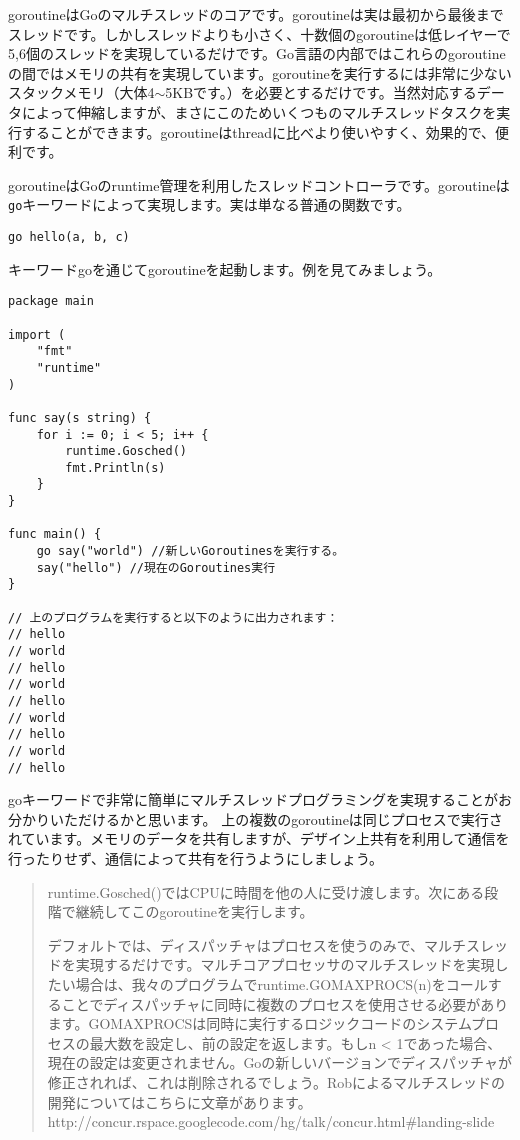 goroutineはGoのマルチスレッドのコアです。goroutineは実は最初から最後までスレッドです。しかしスレッドよりも小さく、十数個のgoroutineは低レイヤーで5,6個のスレッドを実現しているだけです。Go言語の内部ではこれらのgoroutineの間ではメモリの共有を実現しています。goroutineを実行するには非常に少ないスタックメモリ（大体4$\sim$5KBです。）を必要とするだけです。当然対応するデータによって伸縮しますが、まさにこのためいくつものマルチスレッドタスクを実行することができます。goroutineはthreadに比べより使いやすく、効果的で、便利です。

goroutineはGoのruntime管理を利用したスレッドコントローラです。goroutineは\texttt{go}キーワードによって実現します。実は単なる普通の関数です。

\begin{lstlisting}[numbers=none]
go hello(a, b, c)
\end{lstlisting}

キーワードgoを通じてgoroutineを起動します。例を見てみましょう。

\begin{lstlisting}[numbers=none]
package main

import (
    "fmt"
    "runtime"
)

func say(s string) {
    for i := 0; i < 5; i++ {
        runtime.Gosched()
        fmt.Println(s)
    }
}

func main() {
    go say("world") //新しいGoroutinesを実行する。
    say("hello") //現在のGoroutines実行
}

// 上のプログラムを実行すると以下のように出力されます：
// hello
// world
// hello
// world
// hello
// world
// hello
// world
// hello
\end{lstlisting}

goキーワードで非常に簡単にマルチスレッドプログラミングを実現することがお分かりいただけるかと思います。 上の複数のgoroutineは同じプロセスで実行されています。メモリのデータを共有しますが、デザイン上共有を利用して通信を行ったりせず、通信によって共有を行うようにしましょう。


\begin{quote}
    runtime.Gosched()ではCPUに時間を他の人に受け渡します。次にある段階で継続してこのgoroutineを実行します。

    デフォルトでは、ディスパッチャはプロセスを使うのみで、マルチスレッドを実現するだけです。マルチコアプロセッサのマルチスレッドを実現したい場合は、我々のプログラムでruntime.GOMAXPROCS(n)をコールすることでディスパッチャに同時に複数のプロセスを使用させる必要があります。GOMAXPROCSは同時に実行するロジックコードのシステムプロセスの最大数を設定し、前の設定を返します。もしn < 1であった場合、現在の設定は変更されません。Goの新しいバージョンでディスパッチャが修正されれば、これは削除されるでしょう。Robによるマルチスレッドの開発についてはこちらに文章があります。http:\//\//concur.rspace.googlecode.com\//hg\//talk\//concur.html\#landing-slide
\end{quote}



